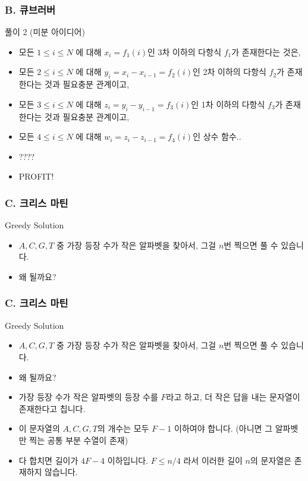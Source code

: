 \documentclass{beamer}
\begin{document}
\begin{frame}
	\frametitle{B. 큐브러버}
	\begin{block}{풀이 2 (미분 아이디어)}
		\begin{itemize}
			\item 모든 $1 \leq i \leq N$ 에 대해 $x_i = f_1(i)$인 3차 이하의 다항식 $f_1$가 존재한다는 것은, 
			\item 모든 $2 \leq i \leq N$ 에 대해 $y_i = x_i - x_{i-1} = f_2(i)$인 2차 이하의 다항식 $f_2$가 존재한다는 것과 필요충분 관계이고,
			\item 모든 $3 \leq i \leq N$ 에 대해 $z_i = y_i - y_{i-1}= f_3(i)$인 1차 이하의 다항식 $f_3$가 존재한다는 것과 필요충분 관계이고,
			\item 모든 $4 \leq i \leq N$ 에 대해 $w_i = z_i - z_{i-1} = f_4(i)$인 상수 함수..
			\item ????
			\item PROFIT!
		\end{itemize}
	\end{block}
\end{frame}

\begin{frame}
	\frametitle{C. 크리스 마틴}
	\begin{block}{Greedy Solution}
		\begin{itemize}
			\item $A, C, G, T$ 중 가장 등장 수가 작은 알파벳을 찾아서, 그걸 $n$번 찍으면 풀 수 있습니다.
			\item 왜 될까요?

		\end{itemize}
	\end{block}
\end{frame}

\begin{frame}
	\frametitle{C. 크리스 마틴}
	\begin{block}{Greedy Solution}
		\begin{itemize}
			\item $A, C, G, T$ 중 가장 등장 수가 작은 알파벳을 찾아서, 그걸 $n$번 찍으면 풀 수 있습니다.
			\item 왜 될까요?
			\item 가장 등장 수가 작은 알파벳의 등장 수를 $F$라고 하고, 더 작은 답을 내는 문자열이 존재한다고 칩니다. 
			\item 이 문자열의 $A, C, G, T$의 개수는 모두 $F-1$ 이하여야 합니다. (아니면 그 알파벳만 찍는 공통 부분 수열이 존재)
			\item 다 합치면 길이가 $4F - 4$ 이하입니다. $F \leq n/4$ 라서 이러한 길이 $n$의 문자열은 존재하지 않습니다. 
		\end{itemize}
	\end{block}
\end{frame}
\end{document}
